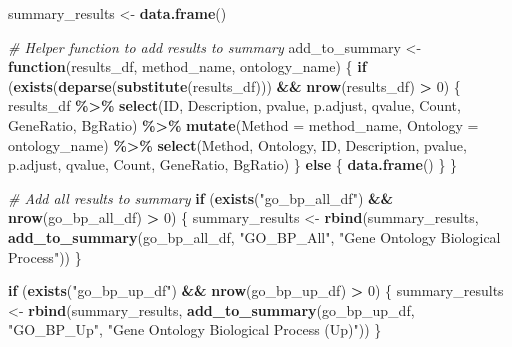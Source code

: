 \documentclass[
]{article}
\newenvironment{Shaded}{\begin{snugshade}}{\end{snugshade}}
\newcommand{\AttributeTok}[1]{\textcolor[rgb]{0.13,0.29,0.53}{#1}}
\newcommand{\CommentTok}[1]{\textcolor[rgb]{0.56,0.35,0.01}{\textit{#1}}}
\newcommand{\ControlFlowTok}[1]{\textcolor[rgb]{0.13,0.29,0.53}{\textbf{#1}}}
\newcommand{\DecValTok}[1]{\textcolor[rgb]{0.00,0.00,0.81}{#1}}
\newcommand{\FunctionTok}[1]{\textcolor[rgb]{0.13,0.29,0.53}{\textbf{#1}}}
\newcommand{\NormalTok}[1]{#1}
\newcommand{\OtherTok}[1]{\textcolor[rgb]{0.56,0.35,0.01}{#1}}
\newcommand{\SpecialCharTok}[1]{\textcolor[rgb]{0.81,0.36,0.00}{\textbf{#1}}}
\newcommand{\StringTok}[1]{\textcolor[rgb]{0.31,0.60,0.02}{#1}}
\begin{document}
\begin{Shaded}
\begin{Highlighting}[]
\NormalTok{summary\_results }\OtherTok{\textless{}{-}} \FunctionTok{data.frame}\NormalTok{()}

\CommentTok{\# Helper function to add results to summary}
\NormalTok{add\_to\_summary }\OtherTok{\textless{}{-}} \ControlFlowTok{function}\NormalTok{(results\_df, method\_name, ontology\_name) \{}
  \ControlFlowTok{if}\NormalTok{ (}\FunctionTok{exists}\NormalTok{(}\FunctionTok{deparse}\NormalTok{(}\FunctionTok{substitute}\NormalTok{(results\_df))) }\SpecialCharTok{\&\&} \FunctionTok{nrow}\NormalTok{(results\_df) }\SpecialCharTok{\textgreater{}} \DecValTok{0}\NormalTok{) \{}
\NormalTok{    results\_df }\SpecialCharTok{\%\textgreater{}\%}
      \FunctionTok{select}\NormalTok{(ID, Description, pvalue, p.adjust, qvalue, Count, GeneRatio, BgRatio) }\SpecialCharTok{\%\textgreater{}\%}
      \FunctionTok{mutate}\NormalTok{(}\AttributeTok{Method =}\NormalTok{ method\_name,}
             \AttributeTok{Ontology =}\NormalTok{ ontology\_name) }\SpecialCharTok{\%\textgreater{}\%}
      \FunctionTok{select}\NormalTok{(Method, Ontology, ID, Description, pvalue, p.adjust, qvalue, Count, GeneRatio, BgRatio)}
\NormalTok{  \} }\ControlFlowTok{else}\NormalTok{ \{}
    \FunctionTok{data.frame}\NormalTok{()}
\NormalTok{  \}}
\NormalTok{\}}

\CommentTok{\# Add all results to summary}
\ControlFlowTok{if}\NormalTok{ (}\FunctionTok{exists}\NormalTok{(}\StringTok{"go\_bp\_all\_df"}\NormalTok{) }\SpecialCharTok{\&\&} \FunctionTok{nrow}\NormalTok{(go\_bp\_all\_df) }\SpecialCharTok{\textgreater{}} \DecValTok{0}\NormalTok{) \{}
\NormalTok{  summary\_results }\OtherTok{\textless{}{-}} \FunctionTok{rbind}\NormalTok{(summary\_results, }
                          \FunctionTok{add\_to\_summary}\NormalTok{(go\_bp\_all\_df, }\StringTok{"GO\_BP\_All"}\NormalTok{, }\StringTok{"Gene Ontology Biological Process"}\NormalTok{))}
\NormalTok{\}}

\ControlFlowTok{if}\NormalTok{ (}\FunctionTok{exists}\NormalTok{(}\StringTok{"go\_bp\_up\_df"}\NormalTok{) }\SpecialCharTok{\&\&} \FunctionTok{nrow}\NormalTok{(go\_bp\_up\_df) }\SpecialCharTok{\textgreater{}} \DecValTok{0}\NormalTok{) \{}
\NormalTok{  summary\_results }\OtherTok{\textless{}{-}} \FunctionTok{rbind}\NormalTok{(summary\_results,}
                          \FunctionTok{add\_to\_summary}\NormalTok{(go\_bp\_up\_df, }\StringTok{"GO\_BP\_Up"}\NormalTok{, }\StringTok{"Gene Ontology Biological Process (Up)"}\NormalTok{))}
\NormalTok{\}}


\end{Highlighting}
\end{Shaded}
\end{document}
